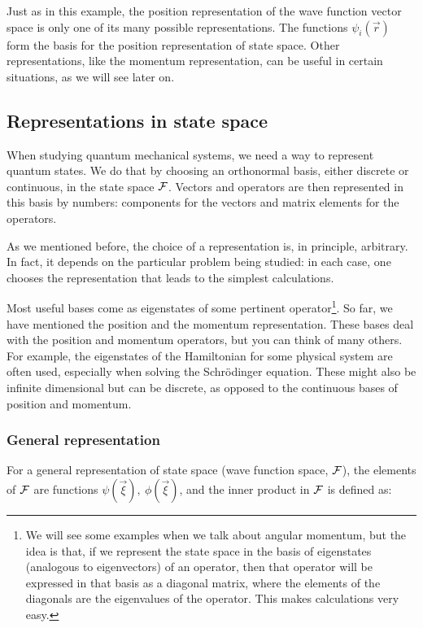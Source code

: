 Just as in this example, the position representation of the wave function vector space is only one of its many possible representations. The functions $\psi_i\left(\vec{r}\right)$ form the basis for the position representation of state space. Other representations, like the momentum representation, can be useful in certain situations, as we will see later on. 


\subsection{Representations in state space}

When studying quantum mechanical systems, we need a way to represent quantum states. We do that by choosing an orthonormal basis, either discrete or continuous, in the state space $\mathcal{F}$. Vectors and operators are then represented in this basis by numbers: components for the vectors and matrix elements for the operators.

As we mentioned before, the choice of a representation is, in principle, arbitrary. In fact, it depends on the particular problem being studied: in each case, one chooses the representation that leads to the simplest calculations. 

Most useful bases come as eigenstates of some pertinent operator\footnote{We will see some examples when we talk about angular momentum, but the idea is that, if we represent the state space in the basis of eigenstates (analogous to eigenvectors) of an operator, then that operator will be expressed in that basis as a diagonal matrix, where the elements of the diagonals are the eigenvalues of the operator. This makes calculations very easy.}. So far, we have mentioned the position and the momentum representation. These bases deal with the position and momentum operators, but you can think of many others. For example, the eigenstates of the Hamiltonian for some physical system are often used, especially when solving the Schrödinger equation. These might also be infinite dimensional but can be discrete, as opposed to the continuous bases of position and momentum.

\subsubsection{General representation}

For a general representation of state space (wave function space, $\mathcal{F}$), the elements of $\mathcal{F}$ are functions $\psi(\vec{\xi}),\ \phi(\vec{\xi})$, and the inner product in $\mathcal{F}$ is defined as:

